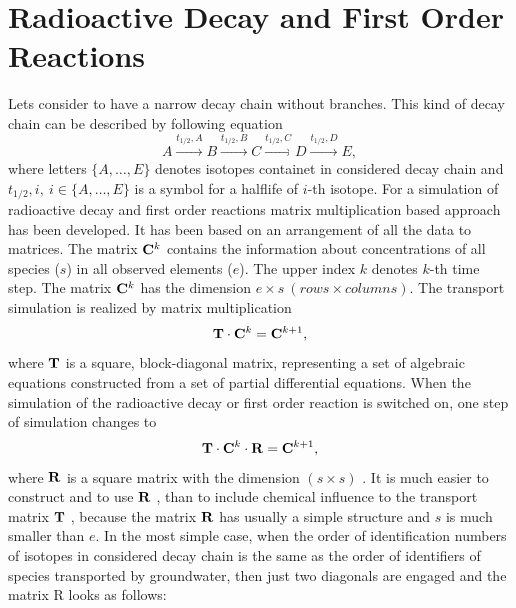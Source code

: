 %
%
%
%

\normalsize

\section{Radioactive Decay and First Order Reactions}
Lets consider to have a narrow decay chain without branches. This kind of decay chain can be described by following equation
\[
 A\xrightarrow{t_{1/2},A}B\xrightarrow{t_{1/2},B}C\xrightarrow{t_{1/2},C}D\xrightarrow{t_{1/2},D}E,
\]
where letters $\{A,\ldots, E\}$ denotes isotopes containet in considered decay chain and ${t_{1/2},i},~i\in\{A,\ldots, E\}$ is a symbol for a halflife of $i$-th isotope.
For a simulation of radioactive decay and first order reactions matrix multiplication based approach has been developed. It has been based on an arrangement of all the data to matrices. The matrix ${\bf C}^k$ contains the information about concentrations of all species ($s$) in all observed elements ($e$). The upper index $k$ denotes $k$-th time step. The matrix ${\bf C}^k$ has the dimension $e\times s~( rows \times columns)$.
The transport simulation is realized by matrix multiplication 
\[
  {\bf T}\cdot{\bf C}^k = {\bf C}^{k+1},
\]
where ${\bf T}$ is a square, block-diagonal matrix, representing a set of algebraic equations constructed from a set of partial differential equations.
When the simulation of the radioactive decay or first order reaction is switched on, one step of
simulation changes to 
\[
  {\bf T}\cdot{\bf C}^k\cdot{\bf R} = {\bf C}^{k+1},
\]
where ${\bf R}$ is a square matrix with the dimension $(s \times s)$ . It is much easier to construct and to use ${\bf R}$ , than to include chemical influence to the transport
matrix ${\bf T}$ , because the matrix ${\bf R}$ has usually a simple structure and $s$ is much smaller than $e$. In the most simple case, when the order of identification numbers of isotopes in considered decay chain is the same as the order of identifiers of species transported by groundwater, then just two
diagonals are engaged and the matrix R looks as follows:

